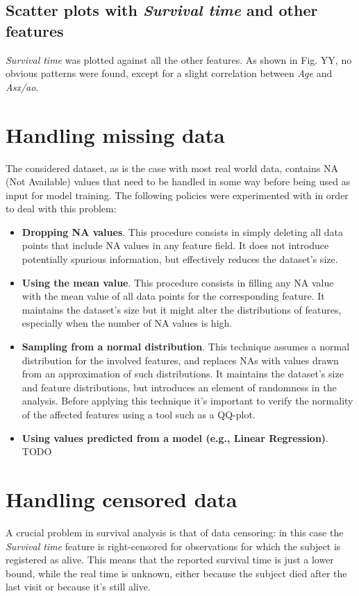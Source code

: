 \documentclass[12pt]{report}
\begin{document}
\subsection*{Scatter plots with \textit{Survival time} and other features}
\textit{Survival time} was plotted against all the other features. As shown in Fig. YY, no obvious patterns were found, except for a slight correlation between \textit{Age} and \textit{Asx/ao}.

\section{Handling missing data}
The considered dataset, as is the case with most real world data, contains NA (Not Available) values that need to be handled in some way before being used as input for model training. The following policies were experimented with in order to deal with this problem:
\begin{itemize}
\item \textbf{Dropping NA values}. This procedure consists in simply deleting all data points that include NA values in any feature field. It does not introduce potentially spurious information, but effectively reduces the dataset's size.
\item \textbf{Using the mean value}. This procedure consists in filling any NA value with the mean value of all data points for the corresponding feature. It maintains the dataset's size but it might alter the distributions of features, especially when the number of NA values is high.
\item \textbf{Sampling from a normal distribution}. This technique assumes a normal distribution for the involved features, and replaces NAs with values drawn from an approximation of such distributions. It maintains the dataset's size and feature distributions, but introduces an element of randomness in the analysis. Before applying this technique it's important to verify the normality of the affected features using a tool such as a QQ-plot.
\item \textbf{Using values predicted from a model (e.g., Linear Regression)}. TODO
\end{itemize}

\section{Handling censored data} \label{handlcens}
A crucial problem in survival analysis is that of data censoring: in this case the \textit{Survival time} feature is right-censored for observations for which the subject is registered as alive. This means that the reported survival time is just a lower bound, while the real time is unknown, either because the subject died after the last visit or because it's still alive.
\end{document}
